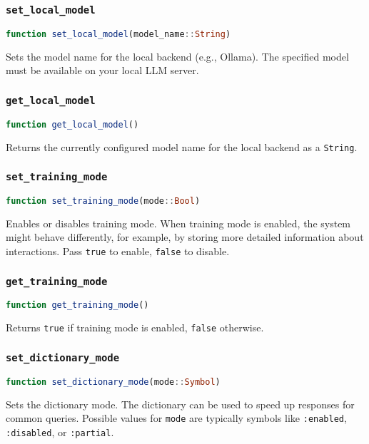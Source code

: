 \documentclass[11pt,a4paper]{article}
\newcommand{\code}[1]{\texttt{#1}}
\newcommand{\func}[1]{\texttt{#1}}
\providecommand{\code}[1]{\texttt{\color{blue!70!black}#1}}
\begin{document}
\subsubsection{\func{set\_local\_model}}
\begin{lstlisting}[language=Julia]
function set_local_model(model_name::String)
\end{lstlisting}
Sets the model name for the local backend (e.g., Ollama). The specified model must be available on your local LLM server.

\subsubsection{\func{get\_local\_model}}
\begin{lstlisting}[language=Julia]
function get_local_model()
\end{lstlisting}
Returns the currently configured model name for the local backend as a \code{String}.

\subsubsection{\func{set\_training\_mode}}
\begin{lstlisting}[language=Julia]
function set_training_mode(mode::Bool)
\end{lstlisting}
Enables or disables training mode. When training mode is enabled, the system might behave differently, for example, by storing more detailed information about interactions. Pass \code{true} to enable, \code{false} to disable.

\subsubsection{\func{get\_training\_mode}}
\begin{lstlisting}[language=Julia]
function get_training_mode()
\end{lstlisting}
Returns \code{true} if training mode is enabled, \code{false} otherwise.

\subsubsection{\func{set\_dictionary\_mode}}
\begin{lstlisting}[language=Julia]
function set_dictionary_mode(mode::Symbol)
\end{lstlisting}
Sets the dictionary mode. The dictionary can be used to speed up responses for common queries. Possible values for \code{mode} are typically symbols like \code{:enabled}, \code{:disabled}, or \code{:partial}.
\end{document}
